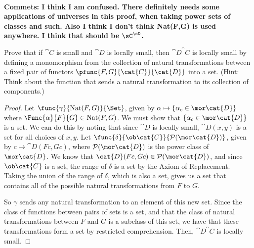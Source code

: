 \documentclass[main.tex]{subfiles}
\begin{document}
\paragraph{}
	\textbf{Commets: I think I am confused. There definitely needs some applications of universes in this proof, when taking power sets of classes and such. Also I think I don't think Nat(F,G) is used anywhere. I think that should be $ \sC^\sD $. }
	\begin{exercise}
		Prove that if $\cat{C}$ is small and $\cat{D}$ is locally small, then $\cat{D}^\cat{C}$ is locally small by defining a monomorphism from the collection of natural transformations between a fixed pair of functors $\pfunc{F,G}{\cat{C}}{\cat{D}}$ into a set. (Hint: Think about the function that sends a natural transformation to its collection of components.)
	\end{exercise}
	
	\begin{proof}
		Let $\func{\gamma}{\text{Nat}(F,G)}{\Set}$, given by $\alpha\mapsto\{\alpha_c\in\mor\cat{D}\}$ where $\Func{\alpha}{F}{G}\in\text{Nat}(F,G)$.
		We must show that $\{\alpha_c\in\mor\cat{D}\}$ is a set. We can do this by noting that since $\cat{D}$ is locally small, $\cat{D}(x,y)$ is a set for all choices of $x,y$. Let $\func{\delta}{\ob\cat{C}}{\mathcal{P}(\mor\cat{D})}$, given by $c\mapsto\cat{D}(Fc,Gc)$, where $\mathcal{P}(\mor\cat{D})$ is the power class of $\mor\cat{D}$. We know that $\cat{D}(Fc,Gc)\in\mathcal{P}(\mor\cat{D})$, and since $\ob\cat{C}$ is a set, the range of $\delta$ is a set by the Axiom of Replacement. Taking the union of the range of $\delta$, which is also a set, gives us a set that contains all of the possible natural transformations from $F$ to $G$.
		
		So $\gamma$ sends any natural transformation to an element of this new set. Since the class of functions between pairs of sets is a set, and that the class of natural transformations between $F$ and $G$ is a subclass of this set, we have that these transformations form a set by restricted comprehension. Then, $\cat{D}^\cat{C}$ is locally small.
		
	\end{proof}
	
\end{document}
